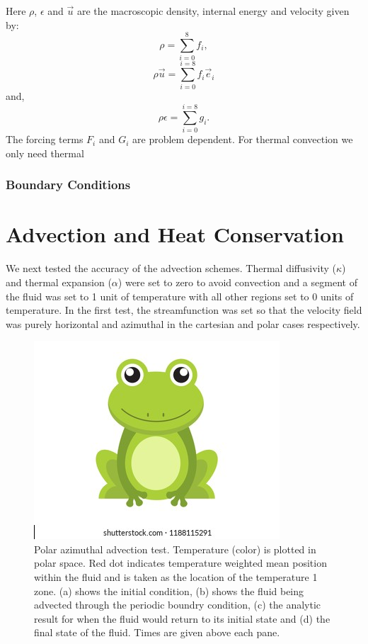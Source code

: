 \documentclass{article}
\begin{document}
Here $\rho$, $\epsilon$ and $\vec{u}$ are the macroscopic density, internal energy and velocity given by:
\begin{equation}
	\rho = \sum_{i=0}^{8} f_{i},
	\label{LBM rho}
\end{equation}
\begin{equation}
	\rho \vec{u} = \sum_{i=0}^{i=8} f_{i} \vec{e}_{i}
	\label{LBM u}
\end{equation}
and,
\begin{equation}
	\rho \epsilon = \sum_{i=0}^{i=8} g_{i}.
	\label{LBM ep}
\end{equation}
The forcing terms $F_i$ and $G_i$ are problem dependent. For thermal convection we only need thermal


\subsubsection*{Boundary Conditions}





\section*{Advection and Heat Conservation}
We next tested the accuracy of the advection schemes. Thermal diffusivity ($\kappa$) and thermal expansion ($\alpha$) were set to zero to avoid convection and a segment of the fluid was set to 1 unit of temperature with all other regions set to 0 units of temperature. In the first test, the streamfunction was set so that the velocity field was purely horizontal and azimuthal in the cartesian and polar cases respectively. 

\begin{figure}
	\centering
	\includegraphics{frog.png}
	\caption{Polar azimuthal advection test. Temperature (color) is plotted in polar space. Red dot indicates temperature weighted mean position within the fluid and is taken as the location of the temperature 1 zone. 
	(a) shows the initial condition, (b) shows the fluid being advected through the periodic boundry condition, (c) the analytic result for when the fluid would return to its initial state and (d) the final state of the fluid.
	Times are given above each pane.}
\end{figure}
\end{document}
